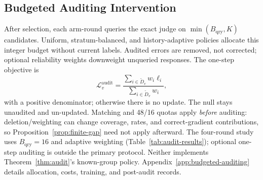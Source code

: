 \subsection{Budgeted Auditing Intervention}
\label{sec:budgeted-auditing}

After selection, each arm-round queries the exact judge on
$\min(B_{\mathrm{qry}},K)$ candidates. Uniform, stratum-balanced, and
history-adaptive policies allocate this integer budget without current labels.
Audited errors are removed, not corrected; optional reliability weights
downweight unqueried responses. The one-step objective is
\begin{equation}
 \mathcal L^{\mathrm{audit}}_v
 =\frac{\sum_{i\in\widetilde D_v}w_i\ell_i}{\sum_{i\in\widetilde D_v}w_i},
 \label{eq:audit-weighted-loss}
\end{equation}
with a positive denominator; otherwise there is no update. The null stays
unaudited and un-updated. Matching and 48/16 quotas apply \emph{before}
auditing: deletion/weighting can change coverage, rates, and correct-gradient
contributions, so Proposition~\ref{prop:finite-gap} need not apply afterward.
The four-round study uses $B_{\mathrm{qry}}=16$ and adaptive weighting
(Table~\ref{tab:audit-results}); optional one-step auditing is outside the
primary protocol. Neither implements Theorem~\ref{thm:audit}'s known-group
policy. Appendix~\ref{app:budgeted-auditing} details allocation, costs,
training, and post-audit records.
